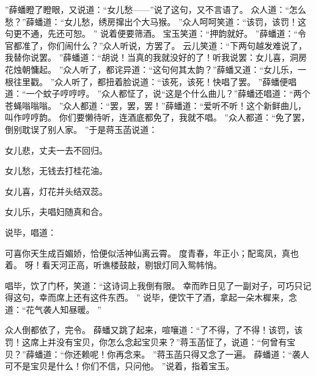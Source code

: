 ”薛蟠瞪了瞪眼，又说道：“女儿愁——”说了这句，又不言语了。
众人道：“怎么愁？”薛蟠道：“女儿愁，绣房撺出个大马猴。
”众人呵呵笑道：“该罚，该罚！这句更不通，先还可恕。
” 
说着便要筛酒。
宝玉笑道：“押韵就好。
”薛蟠道：“令官都准了，你们闹什么？”众人听说，方罢了。
云儿笑道：“下两句越发难说了，我替你说罢。
”薛蟠道：“胡说！当真的我就没好的了！听我说罢：女儿喜，洞房花烛朝慵起。
”众人听了，都诧异道：“这句何其太韵？”薛蟠又道：“女儿乐，一根\jiji \baba 往里戳。
”众人听了，都扭着脸说道：“该死，该死！快唱了罢。
”薛蟠便唱道：“一个蚊子哼哼哼。
”众人都怔了，说“这是个什么曲儿？”薛蟠还唱道：“两个苍蝇嗡嗡嗡。
”众人都道：“罢，罢，罢！”薛蟠道：“爱听不听！这个新鲜曲儿，叫作哼哼韵。
你们要懒待听，连酒底都免了，我就不唱。
”众人都道：“免了罢，倒别耽误了别人家。
”于是蒋玉菡说道：\par
\hop
女儿悲，丈夫一去不回归。
\par
女儿愁，无钱去打桂花油。
\par
女儿喜，灯花并头结双蕊。
\par
女儿乐，夫唱妇随真和合。
\par
\hop
说毕，唱道：\par
\hop
可喜你天生成百媚娇，恰便似活神仙离云霄。
度青春，年正小；配鸾凤，真也着。
呀！看天河正高，听谯楼鼓敲，剔银灯同入鸳帏悄。
\par
\hop
唱毕，饮了门杯，笑道：“这诗词上我倒有限。
幸而昨日见了一副对子，可巧只记得这句，幸而席上还有这件东西。
”
说毕，便饮干了酒，拿起一朵木樨来，念道：“花气袭人知昼暖。
”\par
众人倒都依了，完令。
薛蟠又跳了起来，喧嚷道：“了不得，了不得！该罚，该罚！这席上并没有宝贝，你怎么念起宝贝来？”蒋玉菡怔了，说道：“何曾有宝贝？”薛蟠道：“你还赖呢！你再念来。
”蒋玉菡只得又念了一遍。
薛蟠道：“袭人可不是宝贝是什么！你们不信，只问他。
”说着，指着宝玉。
